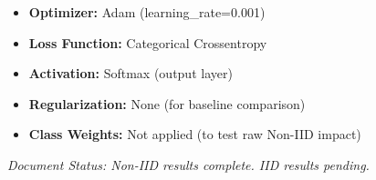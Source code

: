 \documentclass[12pt,a4paper]{article}
\begin{document}
\begin{itemize}
    \item \textbf{Optimizer:} Adam (learning\_rate=0.001)
    \item \textbf{Loss Function:} Categorical Crossentropy
    \item \textbf{Activation:} Softmax (output layer)
    \item \textbf{Regularization:} None (for baseline comparison)
    \item \textbf{Class Weights:} Not applied (to test raw Non-IID impact)
\end{itemize}

\vspace{1cm}

\textit{Document Status: Non-IID results complete. IID results pending.}
\end{document}
